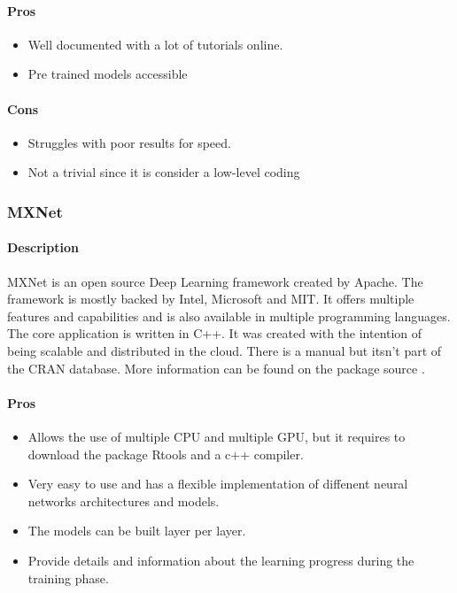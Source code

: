 \documentclass[letter,8pt]{article}\usepackage[]{graphicx}\usepackage[]{color}
\begin{document}
\paragraph{Pros}
\begin{itemize}
\item Well documented with a lot of tutorials online.
\item Pre trained models accessible
\end{itemize}

\paragraph{Cons}
\begin{itemize}
\item Struggles with poor results for speed.
\item Not a trivial since it is consider a low-level coding
\end{itemize}

\subsubsection{MXNet}
\paragraph{Description}
MXNet is an open source Deep Learning framework created by Apache. The framework is mostly backed by Intel, Microsoft and MIT. It offers multiple features and capabilities and is also available in multiple programming languages. The core application is written in C++. It was created with the intention of being scalable and distributed in the cloud. There is a manual but itsn't part of the CRAN database. More information can be found on the package source \cite{mxnet2020}.
\paragraph{Pros}
\begin{itemize}
\item Allows the use of multiple CPU and multiple GPU, but it requires to download the package Rtools and a c++ compiler.
\item Very easy to use and has a flexible implementation of diffenent neural networks architectures and models.
\item The models can be built layer per layer.
\item Provide details and information about the learning progress during the training phase.
\end{itemize}
\end{document}
